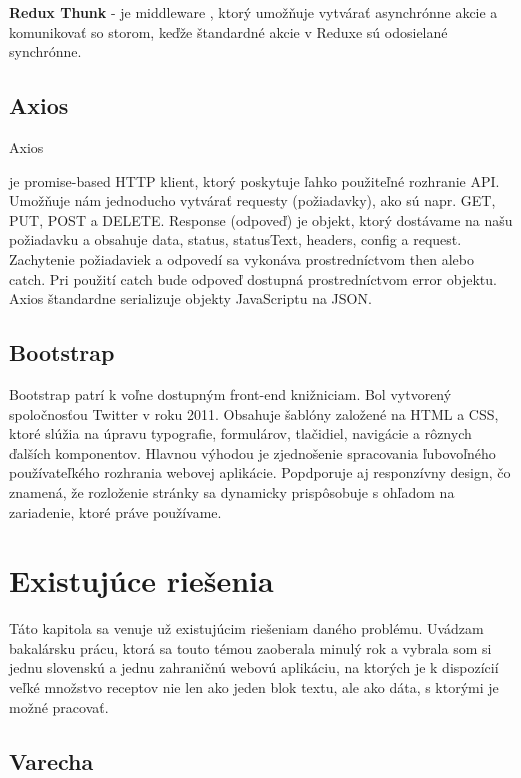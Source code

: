 \textbf{Redux Thunk} - je middleware {\cite{reduxThunk}}, ktorý umožňuje vytvárať asynchrónne akcie a komunikovať so storom, keďže štandardné akcie v Reduxe sú odosielané synchrónne.

\subsection{Axios}
Axios {\cite{axios} je promise-based HTTP klient, ktorý poskytuje ľahko použiteľné rozhranie API. Umožňuje nám jednoducho vytvárať requesty (požiadavky), ako sú napr. GET, PUT, POST a DELETE. Response (odpoveď) je objekt, ktorý dostávame na našu požiadavku a obsahuje data, status, statusText, headers, config a request. Zachytenie požiadaviek a odpovedí sa vykonáva prostredníctvom then alebo catch. Pri použití catch bude odpoveď dostupná prostredníctvom error objektu. Axios štandardne serializuje objekty JavaScriptu na JSON.

\subsection{Bootstrap}
Bootstrap {\cite{bootstrap}} patrí k voľne dostupným front-end knižniciam. Bol vytvorený spoločnosťou Twitter v roku 2011. Obsahuje šablóny založené na HTML a CSS, ktoré slúžia na úpravu typografie, formulárov, tlačidiel, navigácie a rôznych ďalších komponentov.  Hlavnou výhodou je zjednošenie spracovania ľubovoľného používateľkého rozhrania webovej aplikácie. Popdporuje aj responzívny design, čo znamená, že rozloženie stránky sa dynamicky prispôsobuje s ohľadom na zariadenie, ktoré práve používame.

\section{Existujúce riešenia} 
Táto kapitola sa venuje už existujúcim riešeniam daného problému. Uvádzam bakalársku prácu, ktorá sa touto témou zaoberala minulý rok a vybrala som si jednu slovenskú
a jednu zahraničnú webovú aplikáciu, na ktorých je k dispozícií veľké množstvo receptov nie len ako jeden blok textu, ale ako dáta, s ktorými je možné pracovať.

\subsection{Varecha}

}
